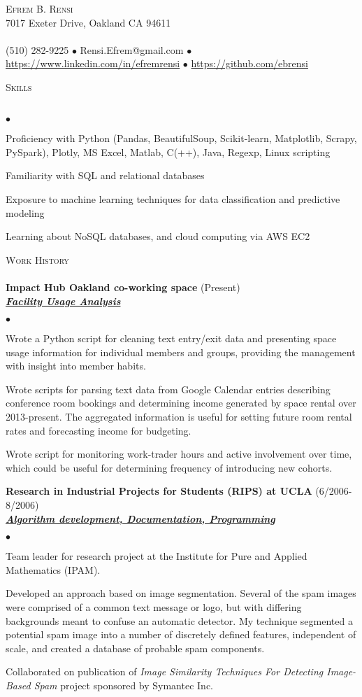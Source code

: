 \documentclass{article}
\newcommand{\lineunder}{\vspace*{-8pt} \\ \hspace*{-18pt} \hrulefill \\}
\newcommand{\header}[1]{{\hspace*{-15pt}\vspace*{6pt} \textsc{#1}} \vspace*{-6pt} \lineunder}
\newcommand{\employer}[3]{{ \textbf{#1} (#2)\\ \underline{\textbf{\emph{#3}}}\\  }}
\newcommand{\contact}[3]{
\vspace*{-8pt}
\begin{center}
{\LARGE \scshape {#1}}\\
#2 \lineunder 
#3
\end{center}
\vspace*{-8pt}
}
\newenvironment{achievements}{\begin{list}{$\bullet$}{\topsep 0pt \itemsep -2pt}}{\vspace*{4pt}\end{list}}
\begin{document}
\small
\smallskip
\vspace*{-44pt}

\contact{Efrem B. Rensi}
{7017 Exeter Drive, Oakland CA 94611}
{(510) 282-9225 $\bullet$ Rensi.Efrem@gmail.com  $\bullet$ \url{https://www.linkedin.com/in/efremrensi} 
$\bullet$ \url{https://github.com/ebrensi}
}
\bigskip

\medskip
\header{Skills}
\begin{achievements}
\item Proficiency with Python (Pandas, BeautifulSoup, Scikit-learn, Matplotlib, Scrapy, PySpark), Plotly, MS Excel, Matlab, C(++), Java, Regexp, Linux scripting  
\item Familiarity with SQL and relational databases
\item Exposure to machine learning techniques for data classification and predictive modeling
\item Learning about NoSQL databases, and cloud computing via AWS EC2
\end{achievements}
\medskip

\header{Work History}
\employer{Impact Hub Oakland co-working space}{Present}{Facility Usage Analysis}
\begin{achievements}
	\item Wrote a Python script for cleaning text entry/exit data and presenting space usage information for individual members and groups, providing the management with insight into member habits. 
 \item Wrote scripts for parsing text data from Google Calendar entries describing conference room bookings and determining income generated by space rental over 2013-present.  The aggregated information is useful for setting future room rental rates and forecasting income for budgeting.
\item Wrote script for monitoring work-trader hours and active involvement over time, which could be useful for determining frequency of introducing new cohorts.
\end{achievements}

\employer{Research in Industrial Projects for Students (RIPS) at UCLA}{6/2006-8/2006}{Algorithm development, Documentation, Programming}
	\begin{achievements}
	\item Team leader for research project at the Institute for Pure and Applied Mathematics (IPAM). 
	\item Developed an approach based on image segmentation. Several of the spam images were comprised of a common text message or logo, but with differing backgrounds meant to confuse an automatic detector. My technique segmented a potential spam image into a number of discretely defined features, independent of scale, and created a database of probable spam components.
	\item Collaborated on publication of \emph{Image Similarity Techniques For Detecting Image-Based Spam} project sponsored by Symantec Inc.

	\end{achievements}
\end{document}
